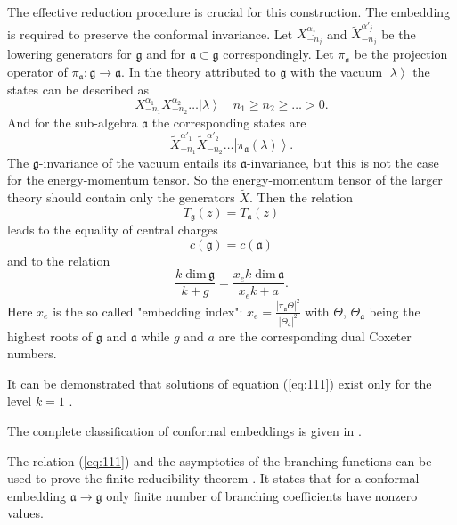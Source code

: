 \documentclass[12pt]{iopart}
\theoremstyle{definition}
\newcommand{\af}{\mathfrak{a}}
\begin{document}
The effective reduction procedure is crucial for this construction.
The embedding is required to preserve the conformal invariance.
Let $X^{\alpha_j}_{-n_j}$ and $\tilde{X}^{\alpha'_j}_{-n_j}$ be the lowering generators for
$\mathfrak{g}$ and for $\af\subset\mathfrak{g}$ correspondingly.
Let $\pi_{\af}$ be the projection operator of
$\pi_{\af}:\mathfrak{g}\longrightarrow \af$.
In the theory attributed to $\mathfrak{g}$ with the vacuum $\left|\lambda\right>$
the states can be described as
\begin{equation*}
  \label{eq:109}
  X^{\alpha_1}_{-n_1}X^{\alpha_2}_{-n_2}\dots\left|\lambda\right>\quad n_1\geq n_2\geq \dots>0.
\end{equation*}
And for the sub-algebra $\af$ the corresponding states are
\begin{equation*}
  \label{eq:110}
  \tilde{X}^{\alpha'_1}_{-n_1}\tilde{X}^{\alpha'_2}_{-n_2}\dots\left|\pi_{\af}(\lambda)\right>.
\end{equation*}
The $\mathfrak{g}$-invariance of the vacuum entails its $\af$-invariance,
but this is not the case for the energy-momentum tensor. So the energy-momentum tensor of the larger theory
should contain only the generators $\tilde{X}$. Then the relation
\begin{equation}
  \label{eq:2}
  T_{\mathfrak{g}}(z)=T_{\af}(z)
\end{equation}
leads to the equality of central charges
\begin{equation*}
  \label{eq:33}
  c(\mathfrak{g})=c(\af)
\end{equation*}
and to the relation
\begin{equation}
  \label{eq:111}
  \frac{k\;\mathrm{dim}\,\mathfrak{g}}{k+g}=\frac{x_e k\; \mathrm{dim}\,\af}{x_ek+a}.
\end{equation}
Here $x_e$ is the so called "embedding index":
$x_e=\frac{\left|\pi_{\mathfrak{a}} \Theta\right|^2}{\left|\Theta_{\mathfrak{a}}\right|^2}$
with $\Theta$, $\Theta_{\mathfrak{a}}$ being the highest roots of
$\mathfrak{g}$ and $\mathfrak{a}$
while $g$  and $a$ are the  corresponding dual Coxeter numbers.

It can be demonstrated that solutions of equation (\ref{eq:111}) exist only
for the level $k=1$ \cite{difrancesco1997cft}.

The complete classification of conformal embeddings is given in \cite{schellekens1986conformal}.

The relation (\ref{eq:111}) and the asymptotics of the branching functions can be used
to prove the finite reducibility theorem \cite{kac1988modular}.
It states that for a conformal embedding  $\af\longrightarrow\mathfrak{g}$
only finite number of branching coefficients have nonzero values.
\end{document}
